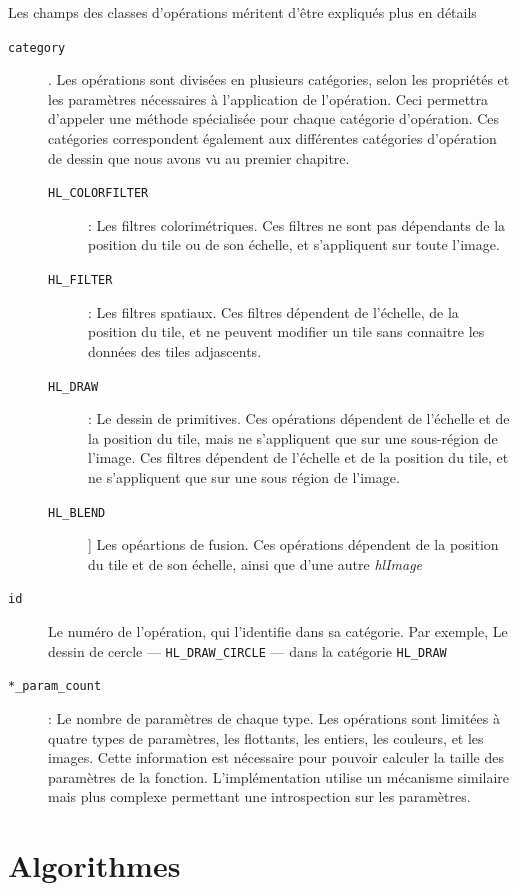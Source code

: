			Les champs des classes d'opérations méritent d'être expliqués plus en détails	
			\begin{description}
				\item[\texttt{category}]. Les opérations sont divisées en plusieurs catégories, selon les propriétés et les paramètres
				nécessaires à l'application de l'opération. Ceci permettra d'appeler une méthode spécialisée pour chaque catégorie d'opération.
				Ces catégories correspondent également aux différentes catégories d'opération de dessin que nous avons vu au premier chapitre. 
				\begin{description}
					\item[\texttt{HL\_COLORFILTER}]: Les filtres colorimétriques. Ces filtres ne sont pas dépendants de la position du tile ou de son échelle, et s'appliquent
					sur toute l'image. 
					\item[\texttt{HL\_FILTER}]: Les filtres spatiaux. Ces filtres dépendent de l'échelle, de la position du tile, 
					et ne peuvent modifier un tile sans connaitre les données des tiles adjascents.
					\item[\texttt{HL\_DRAW}]: Le dessin de primitives. Ces opérations dépendent de l'échelle et de la position du tile, 
					mais ne s'appliquent que sur une sous-région de l'image.
					 Ces filtres dépendent de l'échelle et de la position du tile, et ne s'appliquent que sur
					une sous région de l'image.
					\item[\texttt{HL\_BLEND}]] Les opéartions de fusion. Ces opérations dépendent de la position du tile et de son échelle, 
					ainsi que d'une autre \emph{hlImage}
				\end{description}
				\item[\texttt{id}]Le numéro de l'opération, qui l'identifie dans sa catégorie. Par exemple, Le dessin de cercle 
				--- \texttt{HL\_DRAW\_CIRCLE} --- dans 
				la catégorie \texttt{HL\_DRAW}
				\item[\texttt{*\_param\_count}]: Le nombre de paramètres de chaque type. Les opérations sont limitées à quatre types de paramètres,
				les flottants, les entiers, les couleurs, et les images. Cette information est nécessaire pour pouvoir calculer la taille des 
				paramètres de la fonction. L'implémentation utilise un mécanisme similaire mais plus complexe permettant une introspection sur les
				paramètres.
			\end{description}
	\section{Algorithmes}
